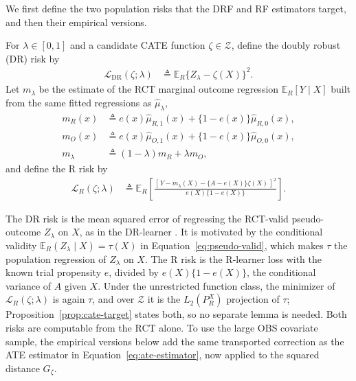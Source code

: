 We first define the two population risks that the DRF and RF estimators target, and then their empirical versions.

\begin{definition}
\label{def:rct-risks}
For $\lambda\in[0,1]$ and a candidate CATE function $\zeta\in\mathcal Z$, define the doubly robust (DR) risk by
\begin{align}
\mathcal L_{\mathrm{DR}}(\zeta;\lambda)&\triangleq\mathbb E_R\{Z_\lambda-\zeta(X)\}^2.
\label{eq:dr-risk}
\end{align}
Let $m_\lambda$ be the estimate of the RCT marginal outcome regression $\mathbb E_R[Y\mid X]$ built from the same fitted regressions as $\widehat\mu_\lambda$,
\begin{align*}
	m_R(x)&\triangleq e(x)\widehat\mu_{R,1}(x)+\{1-e(x)\}\widehat\mu_{R,0}(x), \\ 
	m_O(x)&\triangleq e(x)\widehat\mu_{O,1}(x)+\{1-e(x)\}\widehat\mu_{O,0}(x), \\
	m_\lambda&\triangleq(1-\lambda)m_R+\lambda m_O,
\end{align*}
and define the R risk by
\begin{align}
\mathcal L_R(\zeta;\lambda)&\triangleq\mathbb E_R\left[\frac{[\,Y-m_\lambda(X)-\{A-e(X)\}\zeta(X)\,]^2}{e(X)\{1-e(X)\}}\right].
\label{eq:r-risk}
\end{align}
\end{definition}

The DR risk is the mean squared error of regressing the RCT-valid pseudo-outcome $Z_\lambda$ on $X$, as in the DR-learner \citep{kennedy2022drlearner}. It is motivated by the conditional validity $\mathbb E_R(Z_\lambda\mid X)=\tau(X)$ in Equation~\eqref{eq:pseudo-valid}, which makes $\tau$ the population regression of $Z_\lambda$ on $X$. The R risk is the R-learner loss \citep{nie2020rlearner} with the known trial propensity $e$, divided by $e(X)\{1-e(X)\}$, the conditional variance of $A$ given $X$. Under the unrestricted function class, the minimizer of $\mathcal L_R(\zeta;\lambda)$ is again $\tau$, and over $\mathcal Z$ it is the $L_2(P_R^X)$ projection of $\tau$; Proposition~\ref{prop:cate-target} states both, so no separate lemma is needed. Both risks are computable from the RCT alone. To use the large OBS covariate sample, the empirical versions below add the same transported correction as the ATE estimator in Equation~\eqref{eq:ate-estimator}, now applied to the squared distance $G_\zeta$.

